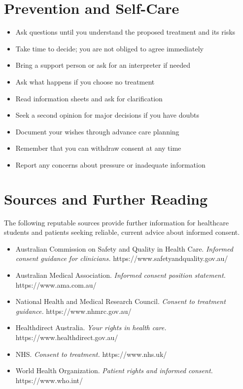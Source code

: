 \section*{Prevention and Self-Care}
\begin{itemize}
    \item Ask questions until you understand the proposed treatment and its risks
    \item Take time to decide; you are not obliged to agree immediately
    \item Bring a support person or ask for an interpreter if needed
    \item Ask what happens if you choose no treatment
    \item Read information sheets and ask for clarification
    \item Seek a second opinion for major decisions if you have doubts
    \item Document your wishes through advance care planning
    \item Remember that you can withdraw consent at any time
    \item Report any concerns about pressure or inadequate information
\end{itemize}

\section*{Sources and Further Reading}
The following reputable sources provide further information for healthcare students and patients seeking reliable, current advice about informed consent.
\begin{itemize}
    \item Australian Commission on Safety and Quality in Health Care. \textit{Informed consent guidance for clinicians.} https://www.safetyandquality.gov.au/
    \item Australian Medical Association. \textit{Informed consent position statement.} https://www.ama.com.au/
    \item National Health and Medical Research Council. \textit{Consent to treatment guidance.} https://www.nhmrc.gov.au/
    \item Healthdirect Australia. \textit{Your rights in health care.} https://www.healthdirect.gov.au/
    \item NHS. \textit{Consent to treatment.} https://www.nhs.uk/
    \item World Health Organization. \textit{Patient rights and informed consent.} https://www.who.int/
\end{itemize}
